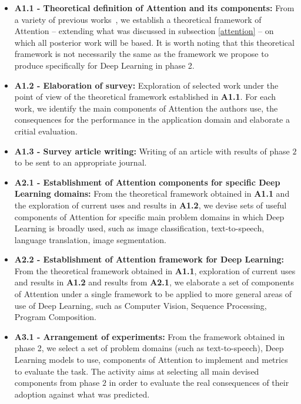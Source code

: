 \documentclass[12pt]{article}
\begin{document}
\begin{itemize}
    \item \textbf{A1.1 - Theoretical definition of Attention and its components:}
        From a variety of previous works~\cite{ref:helgason}\cite{ref:esther-thesis},
        we establish a theoretical framework of Attention
        -- extending what was discussed in subsection \ref{attention} --
        on which all posterior work will be based.
        It is worth noting that this theoretical framework is not necessarily the same as the framework
        we propose to produce specifically for Deep Learning in phase 2.

    \item \textbf{A1.2 - Elaboration of survey:}
        Exploration of selected work under the point of view of the theoretical framework established
        in \textbf{A1.1}.
        For each work, we identify the main components of Attention the authors use, the consequences for the
        performance in the application domain and elaborate a critial evaluation.

    \item \textbf{A1.3 - Survey article writing:}
        Writing of an article with results of phase $2$ to be sent to an appropriate journal.

    \item \textbf{A2.1 - Establishment of Attention components for specific Deep Learning domains:}
        From the theoretical framework obtained in \textbf{A1.1}
        and the exploration of current uses and results in \textbf{A1.2},
        we devise sets of useful components of Attention for specific main problem domains
        in which Deep Learning is broadly used,
        such as image classification, text-to-speech, language translation, image segmentation.

    \item \textbf{A2.2 - Establishment of Attention framework for Deep Learning:}
        From the theoretical framework obtained in \textbf{A1.1},
        exploration of current uses and results in \textbf{A1.2} and
        results from \textbf{A2.1},
        we elaborate a set of components of Attention under a single framework to be applied to more
        general areas of use of Deep Learning,
        such as Computer Vision, Sequence Processing, Program Composition.

    \item \textbf{A3.1 - Arrangement of experiments:}
        From the framework obtained in phase 2, we select a set of problem domains (such as text-to-speech),
        Deep Learning models to use, components of Attention to implement and metrics to evaluate the task.
        The activity aims at selecting all main devised components from phase $2$ in order
        to evaluate the real consequences of their adoption against what was predicted.


\end{itemize}
\end{document}
